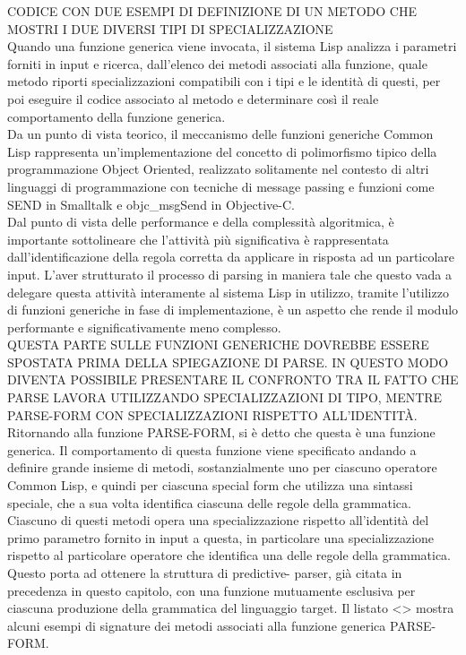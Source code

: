 CODICE CON DUE ESEMPI DI DEFINIZIONE DI UN METODO CHE MOSTRI I DUE DIVERSI
TIPI DI SPECIALIZZAZIONE\\

Quando una funzione generica viene invocata, il sistema Lisp analizza i
parametri forniti in input e ricerca, dall’elenco dei metodi associati alla
funzione, quale metodo riporti specializzazioni compatibili con i tipi e le
identità di questi, per poi eseguire il codice associato al metodo e
determinare così il reale comportamento della funzione generica.\\

Da un punto di vista teorico, il meccanismo delle funzioni generiche Common
Lisp rappresenta un’implementazione del concetto di polimorfismo tipico della
programmazione Object Oriented, realizzato solitamente nel contesto di altri
linguaggi di programmazione con tecniche di message passing e funzioni come
SEND in Smalltalk e objc\_msgSend in Objective-C.\\

Dal punto di vista delle performance e della complessità algoritmica, è
importante sottolineare che l’attività più significativa è rappresentata
dall’identificazione della regola corretta da applicare in risposta ad un
particolare input. L’aver strutturato il processo di parsing in maniera tale
che questo vada a delegare questa attività interamente al sistema Lisp in
utilizzo, tramite l’utilizzo di funzioni generiche in fase di implementazione,
è un aspetto che rende il modulo performante e significativamente meno
complesso.\\

QUESTA PARTE SULLE FUNZIONI GENERICHE DOVREBBE ESSERE SPOSTATA PRIMA DELLA
SPIEGAZIONE DI PARSE. IN QUESTO MODO DIVENTA POSSIBILE PRESENTARE IL CONFRONTO
TRA IL FATTO CHE PARSE LAVORA UTILIZZANDO SPECIALIZZAZIONI DI TIPO, MENTRE
PARSE-FORM CON SPECIALIZZAZIONI RISPETTO ALL’IDENTITÀ.\\

Ritornando alla funzione PARSE-FORM, si è detto che questa è una funzione
generica. Il comportamento di questa funzione viene specificato andando a
definire grande insieme di metodi, sostanzialmente uno per ciascuno operatore
Common Lisp, e quindi per ciascuna special form che utilizza una sintassi
speciale, che a sua volta identifica ciascuna delle regole della grammatica.
Ciascuno di questi metodi opera una specializzazione rispetto all’identità del
primo parametro fornito in input a questa,  in particolare una
specializzazione rispetto al particolare operatore che identifica una delle
regole della grammatica. Questo porta ad ottenere la struttura di predictive-
parser, già citata in precedenza in questo capitolo, con una funzione
mutuamente esclusiva per ciascuna produzione della grammatica del linguaggio
target. Il listato <> mostra alcuni esempi di signature dei metodi associati
alla funzione generica PARSE-FORM.\\

